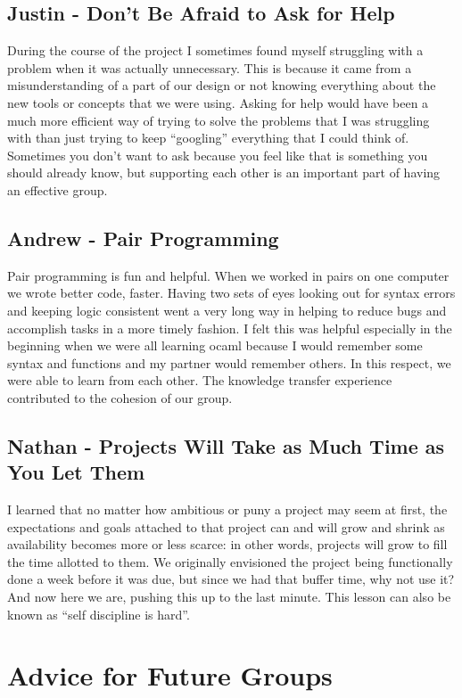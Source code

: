 \subsection{Justin - Don't Be Afraid to Ask for Help}
During the course of the project I sometimes found myself struggling with a
problem when it was actually unnecessary. This is because it came from a
misunderstanding of a part of our design or not knowing everything about the new
tools or concepts that we were using. Asking for help would have been a much
more efficient way of trying to solve the problems that I was struggling with
than just trying to keep ``googling'' everything that I could think of.
Sometimes you don't want to ask because you feel like that is something you
should already know, but supporting each other is an important part of having an
effective group.

\subsection{Andrew - Pair Programming}
Pair programming is fun and helpful. When we worked in pairs on one computer we
wrote better code, faster. Having two sets of eyes looking out for syntax errors
and keeping logic consistent went a very long way in helping to reduce bugs and
accomplish tasks in a more timely fashion. I felt this was helpful especially in
the beginning when we were all learning ocaml because I would remember some
syntax and functions and my partner would remember others. In this respect, we
were able to learn from each other. The knowledge transfer experience
contributed to the cohesion of our group.

\subsection{Nathan - Projects Will Take as Much Time as You Let Them}
I learned that no matter how ambitious or puny a project may seem at
first, the expectations and goals attached to that project can and
will grow and shrink as availability becomes more or less scarce: in
other words, projects will grow to fill the time allotted to them. We
originally envisioned the project being functionally done a week
before it was due, but since we had that buffer time, why not use it?
And now here we are, pushing this up to the last minute. This lesson
can also be known as ``self discipline is hard''.

\section{Advice for Future Groups}


